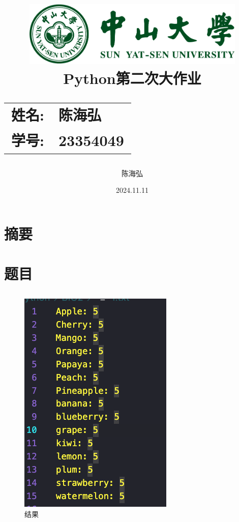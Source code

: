 \documentclass[12pt,a4paper,oneside]{article}
\date{\Large 2024.11.11}
\author{陈海弘}
\title{
    \vspace*{-2cm}
    \includegraphics[width=0.8\textwidth]{SYSULogo.pdf} \\[1em]
    \vfill
    \LARGE \textbf{Python第二次大作业} \\[1em]
    \Large
    \begin{tabular}{rl}
        \textbf{姓名:} & \textbf{陈海弘} \\
        \textbf{学号:} & \textbf{23354049}
    \end{tabular}
    \vfill
}
\begin{document}
\maketitle
\newpage
\tableofcontents

\newpage
\section{摘要}
\section{题目}
\subsection{}
\begin{figure}[H]
    \centering
    \begin{minipage}{0.1874\textwidth}
        \centering
        \includegraphics[width=\textwidth]{image/1} %
        \caption{结果}
        \label{fig:image1}
    \end{minipage}
\end{figure}
\end{document}
